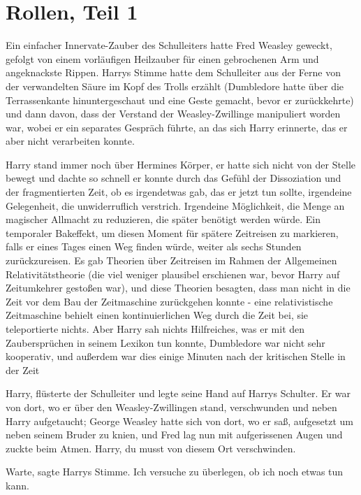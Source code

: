 \chapter{Rollen, Teil 1}

Ein einfacher Innervate-Zauber des Schulleiters hatte Fred Weasley geweckt,
gefolgt von einem vorläufigen Heilzauber für einen gebrochenen Arm und
angeknackste Rippen. Harrys Stimme hatte dem Schulleiter aus der Ferne von der
verwandelten Säure im Kopf des Trolls erzählt (Dumbledore hatte über die
Terrassenkante hinuntergeschaut und eine Geste gemacht, bevor er zurückkehrte)
und dann davon, dass der Verstand der Weasley-Zwillinge manipuliert worden war,
wobei er ein separates Gespräch führte, an das sich Harry erinnerte, das er aber
nicht verarbeiten konnte.

Harry stand immer noch über Hermines Körper, er hatte sich nicht von der Stelle
bewegt und dachte so schnell er konnte durch das Gefühl der Dissoziation und der
fragmentierten Zeit, ob es irgendetwas gab, das er jetzt tun sollte, irgendeine
Gelegenheit, die unwiderruflich verstrich. Irgendeine Möglichkeit, die Menge an
magischer Allmacht zu reduzieren, die später benötigt werden würde. Ein
temporaler Bakeffekt, um diesen Moment für spätere Zeitreisen zu markieren,
falls er eines Tages einen Weg finden würde, weiter als sechs Stunden
zurückzureisen. Es gab Theorien über Zeitreisen im Rahmen der Allgemeinen
Relativitätstheorie (die viel weniger plausibel erschienen war, bevor Harry auf
Zeitumkehrer gestoßen war), und diese Theorien besagten, dass man nicht in die
Zeit vor dem Bau der Zeitmaschine zurückgehen konnte - eine relativistische
Zeitmaschine behielt einen kontinuierlichen Weg durch die Zeit bei, sie
teleportierte nichts. Aber Harry sah nichts Hilfreiches, was er mit den
Zaubersprüchen in seinem Lexikon tun konnte, Dumbledore war nicht sehr
kooperativ, und außerdem war dies einige Minuten nach der kritischen Stelle in
der Zeit

\glqq Harry\grqq{}, flüsterte der Schulleiter und legte seine Hand auf Harrys
Schulter. Er war von dort, wo er über den Weasley-Zwillingen stand, verschwunden
und neben Harry aufgetaucht; George Weasley hatte sich von dort, wo er saß,
aufgesetzt um neben seinem Bruder zu knien, und Fred lag nun mit aufgerissenen
Augen und zuckte beim Atmen. \glqq Harry, du musst von diesem Ort
verschwinden.\grqq{}

\glqq Warte\grqq{}, sagte Harrys Stimme. \glqq Ich versuche zu überlegen, ob ich
noch etwas tun kann.\grqq{}

